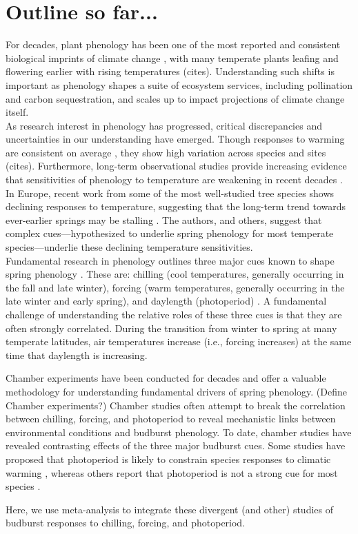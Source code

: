 \documentclass[11pt,letter]{article}
\begin{document}
{
\section{Outline so far...}

For decades, plant phenology has been one of the most reported and consistent biological imprints of climate change \citep{IPCC:2014sm}, with many temperate plants leafing and flowering earlier with rising temperatures (cites). Understanding such shifts is important as phenology shapes a suite of ecosystem services, including pollination and carbon sequestration, and scales up to impact projections of climate change itself. \\

As research interest in phenology has progressed, critical discrepancies and uncertainties in our understanding have emerged. Though responses to warming are consistent on average \citep{Wolkovich:2012n}, they show high variation across species and sites (cites). Furthermore, long-term observational studies provide increasing evidence that sensitivities of phenology to temperature are weakening in recent decades \citep{yu2010}. In Europe, recent work from some of the most well-studied tree species shows declining responses to temperature, suggesting that the long-term trend towards ever-earlier springs may be stalling \citep{fu2015}. The authors, and others, suggest that complex cues---hypothesized to underlie spring phenology for most temperate species---underlie these declining temperature sensitivities.\\

Fundamental research in phenology outlines three major cues known to shape spring phenology \citep{chuineJTB}. These are: chilling (cool temperatures, generally occurring in the fall and late winter), forcing (warm temperatures, generally occurring in the late winter and early spring), and daylength (photoperiod) .  A fundamental challenge of understanding the relative roles of these three cues is that they are often strongly correlated. During the transition from winter to spring at many temperate latitudes, air temperatures increase (i.e., forcing increases) at the same time that daylength is increasing. 

\par Chamber experiments have been conducted for decades and offer a valuable methodology for understanding fundamental drivers of spring phenology. (Define Chamber experiments?) Chamber studies often attempt to break the correlation between chilling, forcing, and photoperiod to reveal mechanistic links between environmental conditions and budburst phenology. To date, chamber studies have revealed contrasting effects of the three major budburst cues. Some studies have proposed that photoperiod is likely to constrain species responses to climatic warming \citep{Basler:2012, Caffarra:2011b,Caffarra:2011a}, whereas others report that photoperiod is not a strong cue for most species \citep{zohner2016,Laube:2014a}. 
\par Here, we use meta-analysis to integrate these divergent (and other)  studies of budburst responses to chilling, forcing, and photoperiod. 

}
\end{document}
